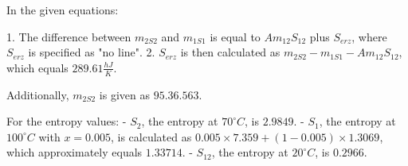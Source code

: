 In the given equations:

1. The difference between \( m_{2S2} \) and \( m_{1S1} \) is equal to \( Am_{12}S_{12} \) plus \( S_{erz} \), where \( S_{erz} \) is specified as "no line".
2. \( S_{erz} \) is then calculated as \( m_{2S2} - m_{1S1} - Am_{12}S_{12} \), which equals \( 289.61 \frac{hJ}{K} \).

Additionally, \( m_{2S2} \) is given as \( 95.36.563 \).

For the entropy values:
- \( S_2 \), the entropy at \( 70^\circ C \), is \( 2.9849 \).
- \( S_1 \), the entropy at \( 100^\circ C \) with \( x = 0.005 \), is calculated as \( 0.005 \times 7.359 + (1 - 0.005) \times 1.3069 \), which approximately equals \( 1.33714 \).
- \( S_{12} \), the entropy at \( 20^\circ C \), is \( 0.2966 \).